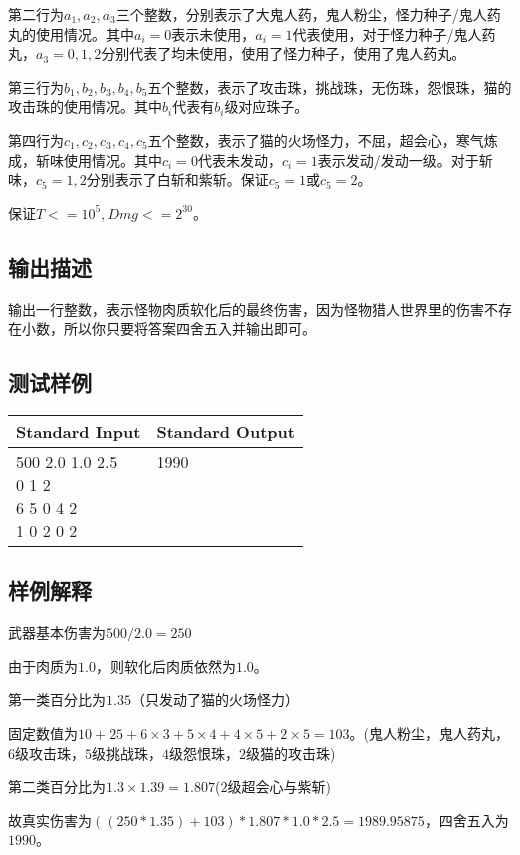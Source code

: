 第二行为$a_1,a_2,a_3$三个整数，分别表示了大鬼人药，鬼人粉尘，怪力种子/鬼人药丸的使用情况。其中$a_i=0$表示未使用，$a_i=1$代表使用，对于怪力种子/鬼人药丸，$a_3=0,1,2$分别代表了均未使用，使用了怪力种子，使用了鬼人药丸。

第三行为$b_1,b_2,b_3,b_4,b_5$五个整数，表示了攻击珠，挑战珠，无伤珠，怨恨珠，猫的攻击珠的使用情况。其中$b_i$代表有$b_i$级对应珠子。

第四行为$c_1,c_2,c_3,c_4,c_5$五个整数，表示了猫的火场怪力，不屈，超会心，寒气炼成，斩味使用情况。其中$c_i=0$代表未发动，$c_i=1$表示发动/发动一级。对于斩味，$c_5=1,2$分别表示了白斩和紫斩。保证$c_5=1$或$c_5=2$。

保证$T<=10^5,Dmg<=2^{30}$。

\subsection*{输出描述}

输出一行整数，表示怪物肉质软化后的最终伤害，因为怪物猎人世界里的伤害不存在小数，所以你只要将答案四舍五入并输出即可。

\subsection*{测试样例}

\begin{table}[H]
\begin{tabularx}{\textwidth}{|X|X|}
    \hline
    \textbf{Standard Input} & \textbf{Standard Output} \\ 
    \hline 
    \tablecell{
        500 2.0 1.0 2.5 \\
        0 1 2 \\
        6 5 0 4 2 \\
        1 0 2 0 2 \\
    } & 
    \tablecell{ 1990 \\ \\ \\ \\} \\
    \hline
\end{tabularx}
\end{table}
\subsection*{样例解释}
武器基本伤害为$500/2.0=250$

由于肉质为$1.0$，则软化后肉质依然为$1.0$。

第一类百分比为$1.35$（只发动了猫的火场怪力）

固定数值为$10+25+6\times3+5\times4+4\times5+2\times5=103$。(鬼人粉尘，鬼人药丸，$6$级攻击珠，$5$级挑战珠，$4$级怨恨珠，$2$级猫的攻击珠)

第二类百分比为$1.3\times1.39=1.807$($2$级超会心与紫斩)

故真实伤害为$((250*1.35)+103)*1.807*1.0*2.5=1989.95875$，四舍五入为$1990$。